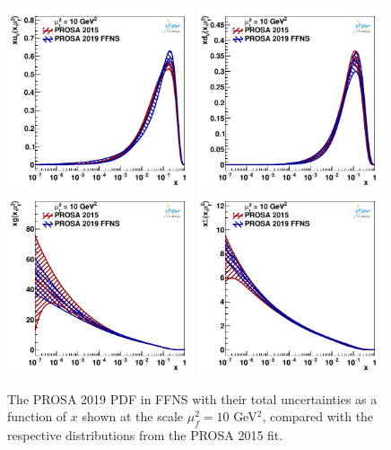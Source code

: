 \documentclass[12pt]{article}
\begin{document}
\begin{figure}
    \centering
    \includegraphics[width=0.49\textwidth]{figs/q2_10_pdf_uv.pdf}
    \includegraphics[width=0.49\textwidth]{figs/q2_10_pdf_dv.pdf}\\
    \includegraphics[width=0.49\textwidth]{figs/q2_10_pdf_g.pdf}
    \includegraphics[width=0.49\textwidth]{figs/q2_10_pdf_Sea.pdf}
    \caption{The PROSA 2019 PDF in FFNS with their total uncertainties as a function of $x$ shown at the scale $\mu^2_f=10$ GeV$^2$, compared with the respective distributions from the PROSA 2015 fit.}
    \label{fig:pdfs}
\end{figure}
\end{document}
